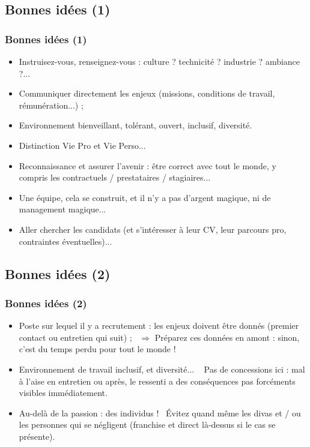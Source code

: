 \documentclass[slidetop,11pt]{beamer}
\begin{document}
\subsection{Bonnes id{\'e}es (1)}
\begin{frame}
	\frametitle{Bonnes id{\'e}es (1)}
	\begin{itemize}
		\item Instruisez-vous, renseignez-vous : culture ? technicit{\'e} ? industrie ? ambiance ?...
		\item Communiquer directement les enjeux (missions, conditions de travail, r{\'e}mun{\'e}ration...) ;
		\item Environnement bienveillant, tol{\'e}rant, ouvert, inclusif, diversit{\'e}. %
		\item Distinction Vie Pro et Vie Perso...
		\item Reconnaissance et assurer l'avenir : {\^e}tre correct avec tout le monde, y compris les contractuels / prestataires / stagiaires...
		\item Une {\'e}quipe, cela se construit, et il n'y a pas d'argent magique, ni de management magique...
		\item Aller chercher les candidats (et s'int{\'e}resser {\`a} leur CV, leur parcours pro, contraintes {\'e}ventuelles)...
	\end{itemize} 
\end{frame}

\subsection{Bonnes id{\'e}es (2)}
\begin{frame}
	\frametitle{Bonnes id{\'e}es (2)}
	\begin{itemize}
		\item Poste sur lequel il y a recrutement : les enjeux doivent {\^e}tre donn{\'e}s (premier contact ou entretien qui suit) ;~\newline
		$\Rightarrow$ Pr{\'e}parez ces donn{\'e}es en amont : sinon, c'est du temps perdu pour tout le monde !
		
		\item Environnement de travail inclusif, et diversit{\'e}... ~\newline
		Pas de concessions ici : mal {\`a} l'aise en entretien ou apr{\`e}s, le ressenti a des cons{\'e}quences pas forc{\'e}ments visibles imm{\'e}diatement.
		
		\item Au-del{\`a} de la passion : des individus !~\newline
		{\'E}vitez quand m{\^e}me les divas et / ou les personnes qui se n{\'e}gligent (franchise et direct l{\`a}-dessus si le cas se pr{\'e}sente). 
	\end{itemize} 
\end{frame}
\end{document}
